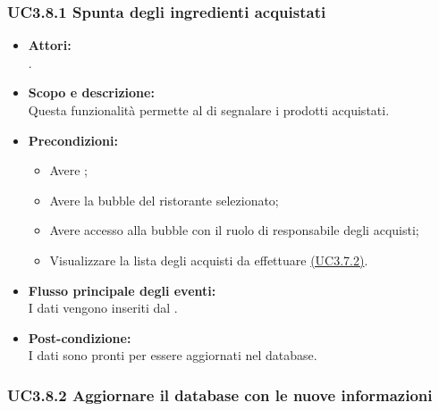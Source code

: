 \subsubsection{UC3.8.1 Spunta degli ingredienti acquistati} \label{UC3.8.1}

\begin{itemize}
	\item \textbf{Attori:}
	\\.
	\item \textbf{Scopo e descrizione:} 
	\\Questa funzionalità permette al  di segnalare i prodotti acquistati.
	\item \textbf{Precondizioni:}
	\begin{itemize}
		\item Avere ;
		\item Avere la bubble del ristorante selezionato;
		\item Avere accesso alla bubble con il ruolo di responsabile degli acquisti;
		\item Visualizzare la lista degli acquisti da effettuare \hyperref[UC3.7.2]{(UC3.7.2)}.
	\end{itemize}
	\item \textbf{Flusso principale degli eventi:}
	\\I dati vengono inseriti dal .
	\item \textbf{Post-condizione:}
	\\I dati sono pronti per essere aggiornati nel database.
\end{itemize}

\subsubsection{UC3.8.2 Aggiornare il database con le nuove informazioni} \label{UC3.8.2}

